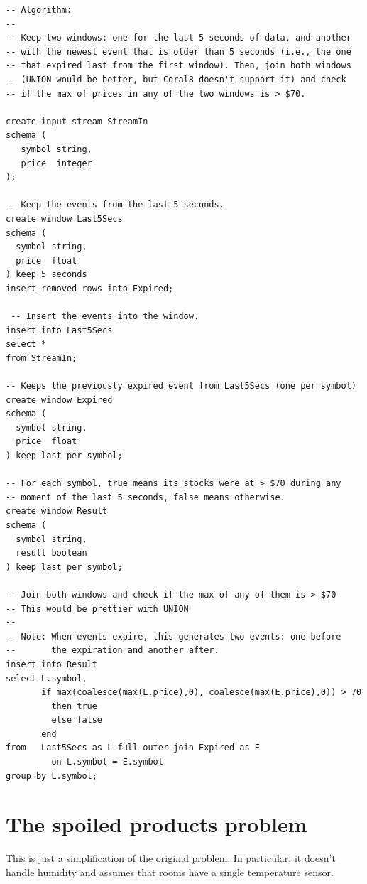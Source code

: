\documentclass{report}
\begin{document}
\begin{lstlisting}
-- Algorithm:
--
-- Keep two windows: one for the last 5 seconds of data, and another
-- with the newest event that is older than 5 seconds (i.e., the one
-- that expired last from the first window). Then, join both windows
-- (UNION would be better, but Coral8 doesn't support it) and check
-- if the max of prices in any of the two windows is > $70.

create input stream StreamIn
schema (
   symbol string,
   price  integer
);

-- Keep the events from the last 5 seconds.
create window Last5Secs
schema (
  symbol string,
  price  float
) keep 5 seconds
insert removed rows into Expired;

 -- Insert the events into the window.
insert into Last5Secs
select *
from StreamIn;

-- Keeps the previously expired event from Last5Secs (one per symbol)
create window Expired
schema (
  symbol string,
  price  float
) keep last per symbol;

-- For each symbol, true means its stocks were at > $70 during any
-- moment of the last 5 seconds, false means otherwise.
create window Result
schema (
  symbol string,
  result boolean
) keep last per symbol;

-- Join both windows and check if the max of any of them is > $70
-- This would be prettier with UNION
--
-- Note: When events expire, this generates two events: one before
--       the expiration and another after.
insert into Result
select L.symbol,
       if max(coalesce(max(L.price),0), coalesce(max(E.price),0)) > 70
         then true
         else false
       end
from   Last5Secs as L full outer join Expired as E
         on L.symbol = E.symbol
group by L.symbol;
\end{lstlisting}

\section{The spoiled products problem}
\label{sec:spoiled-products-solution}

This is just a simplification of the original problem. In particular,
it doesn't handle humidity and assumes that rooms have a single
temperature sensor.
\end{document}
